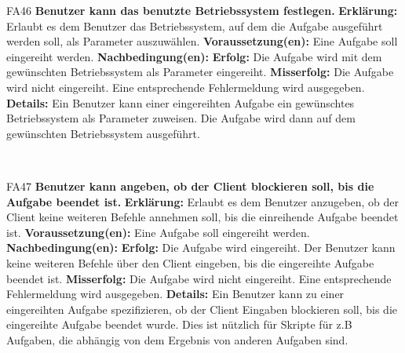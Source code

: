 \documentclass[a4paper,12pt]{article}
\begin{document}
\begin{itemize}[nosep]
	\begin{minipage}[t]{\linewidth}
		\item[FA46] \textbf{Benutzer kann das benutzte Betriebssystem festlegen.}
		\subitem \textbf{Erklärung:} Erlaubt es dem \gls{Benutzer} das Betriebssystem, auf dem die Aufgabe ausgeführt werden soll, als Parameter auszuwählen.
		\subitem \textbf{Voraussetzung(en):} Eine Aufgabe soll eingereiht werden.
		\subitem \textbf{Nachbedingung(en):}
		\subsubitem \textbf{Erfolg:} Die Aufgabe wird mit dem gewünschten Betriebssystem als Parameter eingereiht.
		\subsubitem \textbf{Misserfolg:} Die Aufgabe wird nicht eingereiht. Eine entsprechende Fehlermeldung wird ausgegeben.
		\subitem \textbf{Details:} Ein \gls{Benutzer} kann einer eingereihten Aufgabe ein gewünschtes Betriebssystem als Parameter zuweisen. Die Aufgabe wird dann auf dem gewünschten Betriebssystem ausgeführt.
	\end{minipage}
	\newline
	\\
	
	\begin{minipage}[t]{\linewidth}
		\item[FA47] \textbf{Benutzer kann angeben, ob der \gls{Client} blockieren soll, bis die Aufgabe beendet ist.}
		\subitem \textbf{Erklärung:} Erlaubt es dem \gls{Benutzer} anzugeben, ob der Client keine weiteren Befehle annehmen soll, bis die einreihende Aufgabe beendet ist.
		\subitem \textbf{Voraussetzung(en):} Eine Aufgabe soll eingereiht werden.
		\subitem \textbf{Nachbedingung(en):}
		\subsubitem \textbf{Erfolg:} Die Aufgabe wird eingereiht. Der Benutzer kann keine weiteren Befehle über den Client eingeben, bis die eingereihte Aufgabe beendet ist.
		\subsubitem \textbf{Misserfolg:} Die Aufgabe wird nicht eingereiht. Eine entsprechende Fehlermeldung wird ausgegeben.
		\subitem \textbf{Details:} Ein \gls{Benutzer} kann zu einer eingereihten Aufgabe spezifizieren, ob der Client Eingaben blockieren soll, bis die eingereihte Aufgabe beendet wurde. Dies ist nützlich für Skripte für z.B Aufgaben, die abhängig von dem Ergebnis von anderen Aufgaben sind.
	\end{minipage}
	\newline
	\\
	

\end{itemize}
\end{document}

